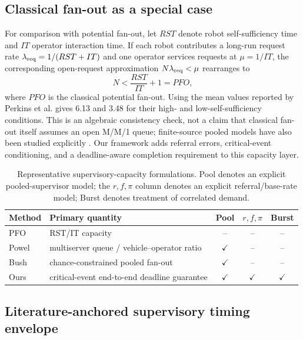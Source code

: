 \documentclass[letterpaper,10pt,conference]{ieeeconf}
\begin{document}
\subsection{Classical fan-out as a special case}

For comparison with potential fan-out, let \(RST\) denote robot self-sufficiency time and \(IT\) operator interaction time. If each robot contributes a long-run request rate \(\lambda_{\rm req}=1/(RST+IT)\) and one operator services requests at \(\mu=1/IT\), the corresponding open-request approximation \(N\lambda_{\rm req}<\mu\) rearranges to
\begin{equation}
N<\frac{RST}{IT}+1=PFO,
\end{equation}
where \(PFO\) is the classical potential fan-out.
Using the mean values reported by Perkins et al. \cite{perkins2025fanout} gives 6.13 and 3.48 for their high- and low-self-sufficiency conditions. This is an algebraic consistency check, not a claim that classical fan-out itself assumes an open M/M/1 queue; finite-source pooled models have also been studied explicitly \cite{bush2015suave}. Our framework adds referral errors, critical-event conditioning, and a deadline-aware completion requirement to this capacity layer.

\begin{table}[t]
\centering
\caption{Representative supervisory-capacity formulations. Pool denotes an explicit pooled-supervisor model; the \(r,f,\pi\) column denotes an explicit referral/base-rate model; Burst denotes treatment of correlated demand.}
\label{tab:prior}
\footnotesize
\setlength{\tabcolsep}{2.5pt}
\begin{tabular}{p{}p{}ccc}
\toprule
Method & Primary quantity & Pool & \(r,f,\pi\) & Burst\\
\midrule
PFO \cite{perkins2025fanout} & RST/IT capacity & -- & -- & --\\
Powel \cite{powel2012multiserver} & multiserver queue / vehicle--operator ratio & $\checkmark$ & -- & --\\
Bush \cite{bush2015suave} & chance-constrained pooled fan-out & $\checkmark$ & -- & --\\
Ours & critical-event end-to-end deadline guarantee & $\checkmark$ & $\checkmark$ & $\checkmark$\\
\bottomrule
\end{tabular}
\end{table}

\subsection{Literature-anchored supervisory timing envelope}
\end{document}
